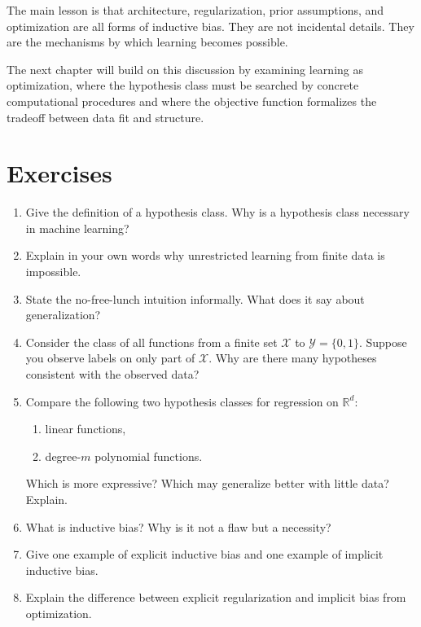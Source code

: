 The main lesson is that architecture, regularization, prior assumptions, and optimization are all forms of inductive bias. They are not incidental details. They are the mechanisms by which learning becomes possible.

The next chapter will build on this discussion by examining learning as optimization, where the hypothesis class must be searched by concrete computational procedures and where the objective function formalizes the tradeoff between data fit and structure.

\section{Exercises}

\begin{enumerate}
    \item Give the definition of a hypothesis class. Why is a hypothesis class necessary in machine learning?

    \item Explain in your own words why unrestricted learning from finite data is impossible.

    \item State the no-free-lunch intuition informally. What does it say about generalization?

    \item Consider the class of all functions from a finite set $\mathcal{X}$ to $\mathcal{Y}=\{0,1\}$. Suppose you observe labels on only part of $\mathcal{X}$. Why are there many hypotheses consistent with the observed data?

    \item Compare the following two hypothesis classes for regression on $\mathbb{R}^d$:
    \begin{enumerate}
        \item linear functions,
        \item degree-$m$ polynomial functions.
    \end{enumerate}
    Which is more expressive? Which may generalize better with little data? Explain.

    \item What is inductive bias? Why is it not a flaw but a necessity?

    \item Give one example of explicit inductive bias and one example of implicit inductive bias.

    \item Explain the difference between explicit regularization and implicit bias from optimization.


\end{enumerate}
